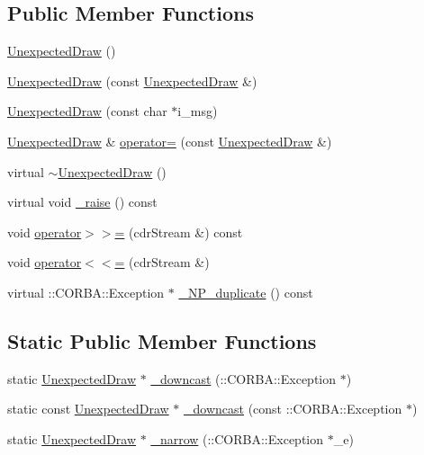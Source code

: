 \subsection*{Public Member Functions}
\begin{DoxyCompactItemize}
\item 
\hyperlink{class_draw_service_1_1_unexpected_draw_a8d99f149c98be743aeda1474ef4a3150}{Unexpected\+Draw} ()
\item 
\hyperlink{class_draw_service_1_1_unexpected_draw_a705f23525bbba765135b599457901ea4}{Unexpected\+Draw} (const \hyperlink{class_draw_service_1_1_unexpected_draw}{Unexpected\+Draw} \&)
\item 
\hyperlink{class_draw_service_1_1_unexpected_draw_a6ff96a39ece3a7e759e8c9771360ec33}{Unexpected\+Draw} (const char $\ast$i\+\_\+msg)
\item 
\hyperlink{class_draw_service_1_1_unexpected_draw}{Unexpected\+Draw} \& \hyperlink{class_draw_service_1_1_unexpected_draw_a3f32fff78b41f267cf5e8d3d2d2577f4}{operator=} (const \hyperlink{class_draw_service_1_1_unexpected_draw}{Unexpected\+Draw} \&)
\item 
virtual \hyperlink{class_draw_service_1_1_unexpected_draw_a7debb0978baebaac52fdee4f6c73b665}{$\sim$\+Unexpected\+Draw} ()
\item 
virtual void \hyperlink{class_draw_service_1_1_unexpected_draw_abe440485243b09451948f4bc3625d847}{\+\_\+raise} () const 
\item 
void \hyperlink{class_draw_service_1_1_unexpected_draw_ae149453aabfce193bf9db5e9e407feb9}{operator$>$$>$=} (cdr\+Stream \&) const 
\item 
void \hyperlink{class_draw_service_1_1_unexpected_draw_a41e398e2730d12811b798bc61a3fc67c}{operator$<$$<$=} (cdr\+Stream \&)
\item 
virtual \+::C\+O\+R\+B\+A\+::\+Exception $\ast$ \hyperlink{class_draw_service_1_1_unexpected_draw_ad39fa3109de12af7e823fd3cc654fb5c}{\+\_\+\+N\+P\+\_\+duplicate} () const 
\end{DoxyCompactItemize}
\subsection*{Static Public Member Functions}
\begin{DoxyCompactItemize}
\item 
static \hyperlink{class_draw_service_1_1_unexpected_draw}{Unexpected\+Draw} $\ast$ \hyperlink{class_draw_service_1_1_unexpected_draw_ad2737183a923bf599535685c820c5508}{\+\_\+downcast} (\+::C\+O\+R\+B\+A\+::\+Exception $\ast$)
\item 
static const \hyperlink{class_draw_service_1_1_unexpected_draw}{Unexpected\+Draw} $\ast$ \hyperlink{class_draw_service_1_1_unexpected_draw_a134de342e078ed237c6b56c3c9e293c8}{\+\_\+downcast} (const \+::C\+O\+R\+B\+A\+::\+Exception $\ast$)
\item 
static \hyperlink{class_draw_service_1_1_unexpected_draw}{Unexpected\+Draw} $\ast$ \hyperlink{class_draw_service_1_1_unexpected_draw_a3d90d6fa2d0a141bfb4648ad27d0f591}{\+\_\+narrow} (\+::C\+O\+R\+B\+A\+::\+Exception $\ast$\+\_\+e)
\end{DoxyCompactItemize}
